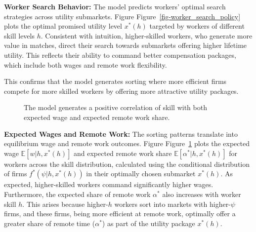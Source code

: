 \documentclass[
  11pt,
  letterpaper,
  DIV=11,
  numbers=noendperiod]{scrartcl}
\theoremstyle{plain}
\theoremstyle{remark}
\begin{document}
\textbf{Worker Search Behavior:} The model predicts workers' optimal
search strategies across utility submarkets. Figure
Figure~\ref{fig-worker_search_policy} plots the optimal promised utility
level \(x^*(h)\) targeted by workers of different skill levels \(h\).
Consistent with intuition, higher-skilled workers, who generate more
value in matches, direct their search towards submarkets offering higher
lifetime utility. This reflects their ability to command better
compensation packages, which include both wages and remote work
flexibility.

This confirms that the model generates sorting where more efficient
firms compete for more skilled workers by offering more attractive
utility packages.

\begin{figure}


\caption{\label{fig-expected_outcomes}The model generates a positive
correlation of skill with both expected wage and expected remote work
share.}

\end{figure}%

\textbf{Expected Wages and Remote Work:} The sorting patterns translate
into equilibrium wage and remote work outcomes. Figure
Figure~\ref{fig-expected_outcomes} plots the expected wage
\(\mathbb{E}[w | h, x^*(h)]\) and expected remote work share
\(\mathbb{E}[\alpha^* | h, x^*(h)]\) for workers across the skill
distribution, calculated using the conditional distribution of firms
\(f^*(\psi | h, x^*(h))\) in their optimally chosen submarket
\(x^*(h)\). As expected, higher-skilled workers command significantly
higher wages. Furthermore, the expected share of remote work
\(\alpha^*\) also increases with worker skill \(h\). This arises because
higher-\(h\) workers sort into markets with higher-\(\psi\) firms, and
these firms, being more efficient at remote work, optimally offer a
greater share of remote time (\(\alpha^*\)) as part of the utility
package \(x^*(h)\).
\end{document}
